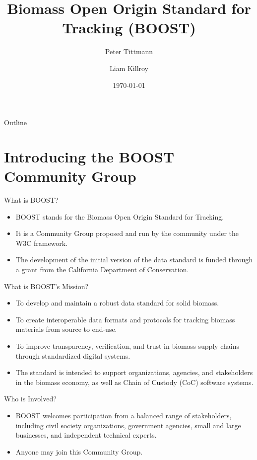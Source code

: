 \documentclass[presentation]{beamer}
\author{Peter Tittmann \and Liam Killroy}
\institute{Carbon Direct}
\date{\today}
\title{Biomass Open Origin Standard for Tracking (BOOST)}
\begin{document}
{
\maketitle
}

\begin{frame}{Outline}
\tableofcontents
\end{frame}
\section{Introducing the BOOST Community Group}
\label{introducing-the-boost-community-group}
\begin{frame}[label={sec:org65c26ad}]{What is BOOST?}
\begin{itemize}
\item BOOST stands for the Biomass Open Origin Standard for Tracking.
\item It is a Community Group proposed and run by the community under the W3C framework.
\item The development of the initial version of the data standard is funded through a grant from the California Department of Conservation.
\end{itemize}
\end{frame}
\begin{frame}[label={sec:org6171ee3}]{What is BOOST's Mission?}
\begin{itemize}
\item To develop and maintain a robust data standard for solid biomass.
\item To create interoperable data formats and protocols for tracking biomass materials from source to end-use.
\item To improve transparency, verification, and trust in biomass supply chains through standardized digital systems.
\item The standard is intended to support organizations, agencies, and stakeholders in the biomass economy, as well as Chain of Custody (CoC) software systems.
\end{itemize}
\end{frame}
\begin{frame}[label={sec:orge677700}]{Who is Involved?}
\begin{itemize}
\item BOOST welcomes participation from a balanced range of stakeholders, including civil society organizations, government agencies, small and large businesses, and independent technical experts.
\item Anyone may join this Community Group.
\end{itemize}
\end{frame}
\end{document}
